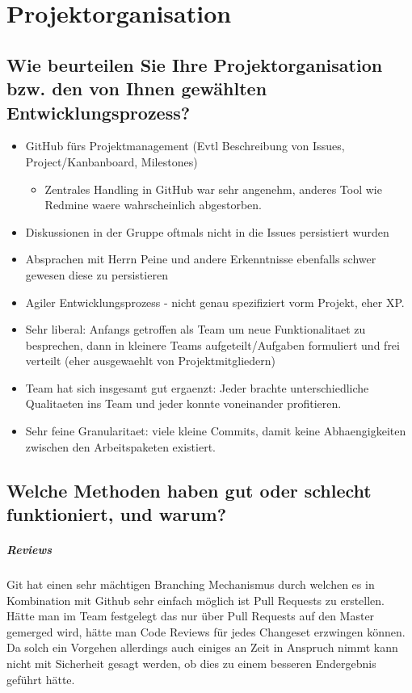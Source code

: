 \documentclass[12pt,DIV14,BCOR10mm,a4paper,parskip=half-,headsepline,headinclude,english,ngerman,bibliography=totocnumbered]{scrreprt}
\begin{document}
\vspace*{-3cm}

\tableofcontents  %

\chapter{Projektorganisation}

\section{Wie beurteilen Sie Ihre Projektorganisation bzw. den von Ihnen gewählten Entwicklungsprozess?}

\begin{itemize}
  \item GitHub fürs Projektmanagement (Evtl Beschreibung von Issues, Project/Kanbanboard, Milestones)
  \begin{itemize}
    \item Zentrales Handling in GitHub war sehr angenehm, anderes Tool wie Redmine waere wahrscheinlich abgestorben.
  \end{itemize}
  \item Diskussionen in der Gruppe oftmals nicht in die Issues persistiert wurden
  \item Absprachen mit Herrn Peine und andere Erkenntnisse ebenfalls schwer gewesen diese zu persistieren
  \item Agiler Entwicklungsprozess - nicht genau spezifiziert vorm Projekt, eher XP.
  \item Sehr liberal: Anfangs getroffen als Team um neue Funktionalitaet zu besprechen, dann in kleinere Teams aufgeteilt/Aufgaben formuliert und frei verteilt (eher ausgewaehlt von Projektmitgliedern)
  \item Team hat sich insgesamt gut ergaenzt: Jeder brachte unterschiedliche Qualitaeten ins Team und jeder konnte voneinander profitieren.
  \item Sehr feine Granularitaet: viele kleine Commits, damit keine Abhaengigkeiten zwischen den Arbeitspaketen existiert.
\end{itemize}



\section{Welche Methoden haben gut oder schlecht funktioniert, und warum?}

\paragraph{Reviews}
Git hat einen sehr mächtigen Branching Mechanismus durch welchen es in Kombination mit Github sehr einfach möglich ist Pull Requests zu erstellen. Hätte man im Team festgelegt das nur über Pull Requests auf den Master gemerged wird, hätte man Code Reviews für jedes Changeset erzwingen können. Da solch ein Vorgehen allerdings auch einiges an Zeit in Anspruch nimmt kann nicht mit Sicherheit gesagt werden, ob dies zu einem besseren Endergebnis geführt hätte.
\end{document}
